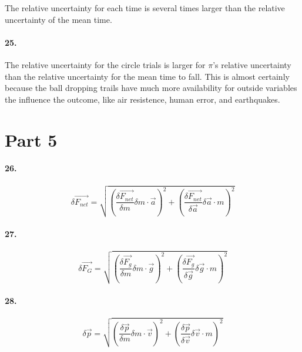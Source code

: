     The relative uncertainty for each time is several times larger than the relative uncertainty of the mean time.

    \paragraph*{25.}
    The relative uncertainty for the circle trials is larger for $\pi$'s relative uncertainty than the relative uncertainty for the mean time to fall. This is almost certainly because the ball dropping trails have much more availability for outside variables the influence the outcome, like air resistence, human error, and earthquakes.

    \pagebreak

    \section*{Part 5}

    \paragraph*{26.}

    \begin{equation*}
        \delta \vec{F_{net}} = \sqrt{\left(\frac{\delta \vec{F_{net}}}{\delta m}\delta m \cdot \vec{a}\right)^2 + \left(\frac{\delta \vec{F_{net}}}{\delta \vec{a}}\delta \vec{a} \cdot m \right)^2}
    \end{equation*}

    \paragraph*{27.}
    
    \begin{equation*}
        \delta \vec{F_{G}} = \sqrt{\left(\frac{\delta \vec{F_{g}}}{\delta m}\delta m \cdot \vec{g}\right)^2 + \left(\frac{\delta \vec{F_{g}}}{\delta \vec{g}}\delta \vec{g} \cdot m \right)^2}
    \end{equation*}

    \paragraph*{28.}

    \begin{equation*}
        \delta \vec{p} = \sqrt{\left(\frac{\delta \vec{p}}{\delta m}\delta m \cdot \vec{v}\right)^2 + \left(\frac{\delta \vec{p}}{\delta \vec{v}}\delta \vec{v} \cdot m \right)^2}
    \end{equation*}

